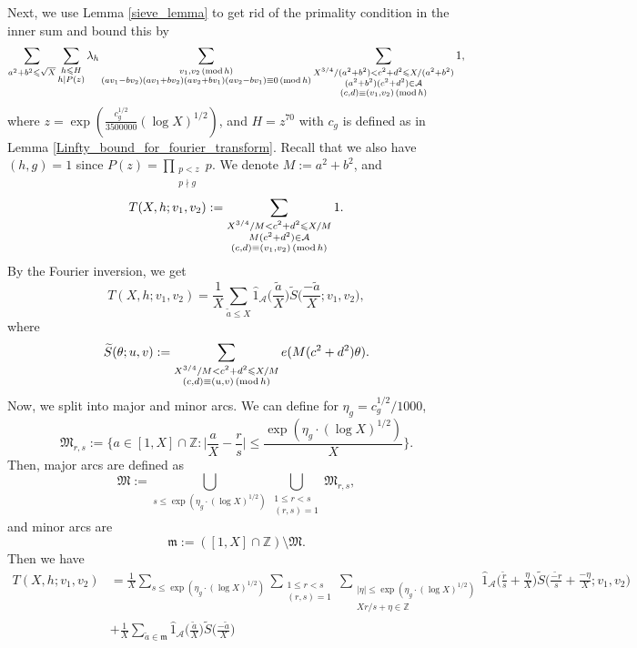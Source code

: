 \documentclass[12pt]{amsart}
\theoremstyle{definition}
\theoremstyle{definition}
\theoremstyle{remark}
\numberwithin{equation}{section}
\newcommand{\Z}{\mathbb{Z}}
\newcommand{\CA}{\mathcal{A}}
\newcommand{\M}{\mathfrak{M}}
\newcommand{\m}{\mathfrak{m}}
\renewcommand{\leq}{\leqslant}
\renewcommand{\hat}{\widehat}
\renewcommand{\tilde}{\widetilde}
\renewcommand{\mod}[1]{\,({\rm mod}\,#1)}
\begin{document}
Next, we use Lemma \ref{sieve_lemma} to get rid of the primality condition in the inner sum and bound this by
\begin{equation}\label{main_eq}
 \sum_{a^2+b^2 \leq \sqrt{X}}  \sum_{\substack{h\leq H \\ h|P(z)}} \lambda_h \sum_{\substack{v_1,v_2 \mod h \\ (av_1 - bv_2)(av_1 + bv_2)(av_2 + b v_1)(av_2 - bv_1) \equiv 0 \mod h}} \sum_{\substack{X^{3/4}/(a^2+b^2) < c^2+d^2 \leq X/(a^2+b^2) \\ (a^2+b^2)(c^2+d^2) \in \CA  \\  (c,d)\equiv (v_1,v_2) \mod h }} 1 , 
\end{equation}
where $z=\exp(\frac{c_g^{1/2}}{3500000}(\log X)^{1/2})$, and $H=z^{70}$ with $c_g$ is defined as in Lemma \ref{Linfty_bound_for_fourier_transform}. Recall that we also have $(h,g)=1$ since $P(z)=\prod_{\substack{p<z \\ p\nmid g}}p$. 
We denote $M:= a^2+b^2$, and
\begin{equation*}
T(X, h ; v_1, v_2)  :=  \sum_{\substack{X^{3/4}/M < c^2+d^2 \leq X/M \\ M(c^2+d^2) \in \CA  \\  (c,d)\equiv (v_1,v_2) \mod h }} 1.
\end{equation*}
By the Fourier inversion, we get
$$T(X, h ; v_1, v_2) = \frac{1}{X} \sum_{\tilde{a}\leq X} \hat{1}_{\CA} \bigg( \frac{\tilde{a}}{X}\bigg) \tilde{S}\bigg( \frac{-\tilde{a}}{X} ; v_1,v_2 \bigg) ,$$
where
$$ \tilde{S}(\theta ; u,v) := \sum_{\substack{X^{3/4}/M < c^2+d^2\leq X/M \\  (c,d)\equiv (u,v)\mod h}} e(M(c^2+d^2) \theta) . $$
Now, we split into major and minor arcs. We can define for $\eta_g = c_g^{1/2}/1000$,
$$ \M_{r,s} := \bigg\{ a \in [1,X] \cap \Z : \bigg|\frac{a}{X} - \frac{r}{s} \bigg| \leq \frac{\exp(\eta_g\cdot (\log X)^{1/2})}{X} \bigg\} . $$
Then, major arcs are defined as
$$ \M := \bigcup_{s\leq \exp(\eta_g\cdot (\log X)^{1/2})}\bigcup_{\substack{ 1 \leq r < s\\ (r,s)=1}} \M_{r,s}, $$
and minor arcs are
$$ \m := ([1,X] \cap \Z)\setminus \M. $$
Then we have
\begin{align*}
T(X, h ; v_1, v_2) &= \frac{1}{X} \sum_{s\leq  \exp(\eta_g\cdot (\log X)^{1/2})} \sum_{\substack{1 \leq r < s \\ (r,s)=1}} \sum_{\substack{|\eta| \leq \exp(\eta_g\cdot (\log X)^{1/2}) \\ Xr/s+\eta \in \Z}} \hat{1}_{\CA} \bigg( \frac{\tilde{r}}{s} + \frac{\eta}{X}\bigg) \tilde{S}\bigg( \frac{\tilde{-r}}{s} + \frac{-\eta}{X} ; v_1,v_2 \bigg) \\
&+ \frac{1}{X} \sum_{\tilde{a} \in \m} \hat{1}_{\CA} \bigg( \frac{\tilde{a}}{X}\bigg) \tilde{S}\bigg( \frac{-\tilde{a}}{X}\bigg)
\end{align*}
\end{document}
